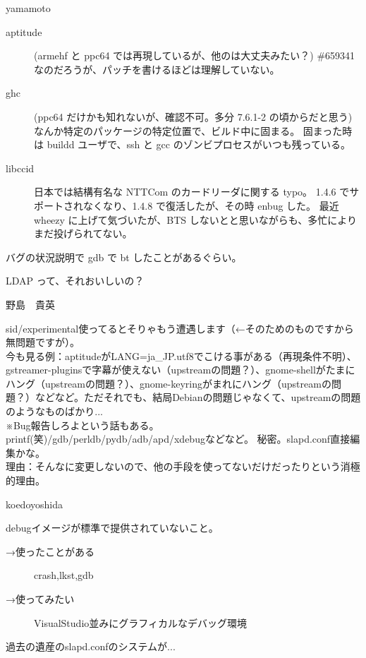 \begin{prework}{ yamamoto }


\begin{description}
\item [aptitude] (armehf と ppc64 では再現しているが、他のは大丈夫みたい？)
\#659341 なのだろうが、パッチを書けるほどは理解していない。

\item [ghc] (ppc64 だけかも知れないが、確認不可。多分 7.6.1-2 の頃からだと思う)
なんか特定のパッケージの特定位置で、ビルド中に固まる。
固まった時は buildd ユーザで、ssh と gcc のゾンビプロセスがいつも残っている。

\item [libccid] 日本では結構有名な NTTCom のカードリーダに関する typo。
1.4.6 でサポートされなくなり、1.4.8 で復活したが、その時 enbug した。
最近 wheezy に上げて気づいたが、BTS しないとと思いながらも、多忙によりまだ投げられてない。
\end{description}

バグの状況説明で gdb で bt したことがあるぐらい。

LDAP って、それおいしいの？
\end{prework}

\begin{prework}{ 野島　貴英 }

sid/experimental使ってるとそりゃもう遭遇します（←そのためのものですから無問題ですが）。\\
今も見る例：aptitudeがLANG=ja\_JP.utf8でこける事がある（再現条件不明）、gstreamer-pluginsで字幕が使えない（upstreamの問題？）、gnome-shellがたまにハング（upstreamの問題？）、gnome-keyringがまれにハング（upstreamの問題？）などなど。ただそれでも、結局Debianの問題じゃなくて、upstreamの問題のようなものばかり...\\
※Bug報告しろよという話もある。
printf(笑)/gdb/perldb/pydb/adb/apd/xdebugなどなど。
 秘密。slapd.conf直接編集かな。\\
理由：そんなに変更しないので、他の手段を使ってないだけだったりという消極的理由。
\end{prework}

\begin{prework}{ koedoyoshida }

debugイメージが標準で提供されていないこと。

\begin{description}
\item [→使ったことがある] crash,lkst,gdb
\item [→使ってみたい] VisualStudio並みにグラフィカルなデバッグ環境
\end{description}
過去の遺産のslapd.confのシステムが...
\end{prework}

